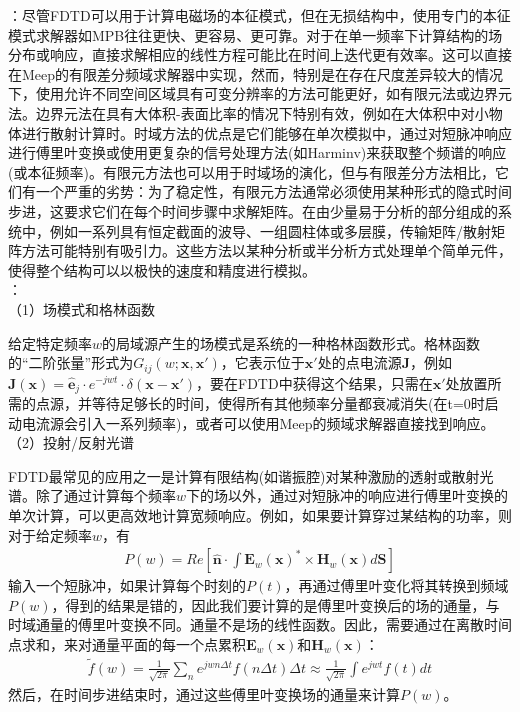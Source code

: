 \documentclass{article}
\numberwithin{equation}{section}
\renewcommand{\vec}[1]{\boldsymbol{#1}}
\begin{document}
\textbf{\color{blue}{Meep的优缺点}}：尽管FDTD可以用于计算电磁场的本征模式，但在无损结构中，使用专门的本征模式求解器如MPB往往更快、更容易、更可靠。对于在单一频率下计算结构的场分布或响应，直接求解相应的线性方程可能比在时间上迭代更有效率。这可以直接在Meep的有限差分频域求解器中实现，然而，特别是在存在尺度差异较大的情况下，使用允许不同空间区域具有可变分辨率的方法可能更好，如有限元法或边界元法。边界元法在具有大体积-表面比率的情况下特别有效，例如在大体积中对小物体进行散射计算时。时域方法的优点是它们能够在单次模拟中，通过对短脉冲响应进行傅里叶变换或使用更复杂的信号处理方法(如Harminv)来获取整个频谱的响应(或本征频率)。有限元方法也可以用于时域场的演化，但与有限差分方法相比，它们有一个严重的劣势：为了稳定性，有限元方法通常必须使用某种形式的隐式时间步进，这要求它们在每个时间步骤中求解矩阵。在由少量易于分析的部分组成的系统中，例如一系列具有恒定截面的波导、一组圆柱体或多层膜，传输矩阵/散射矩阵方法可能特别有吸引力。这些方法以某种分析或半分析方式处理单个简单元件，使得整个结构可以以极快的速度和精度进行模拟。\\
\textbf{\color{blue}{Meep的应用}}：\\
（1）场模式和格林函数\par
给定特定频率$w$的局域源产生的场模式是系统的一种格林函数形式。格林函数的“二阶张量”形式为$G_{ij}(w;\vec{x},\vec{x}')$，它表示位于$\vec{x}'$处的点电流源$\mathbf{J}$，例如$\mathbf{J}(\vec{x})=\hat{\vec{e}}_j\cdot e^{-jwt}\cdot\delta(\vec{x}-\vec{x}')$，要在FDTD中获得这个结果，只需在$\vec{x}'$处放置所需的点源，并等待足够长的时间，使得所有其他频率分量都衰减消失(在t=0时启动电流源会引入一系列频率)，或者可以使用Meep的频域求解器直接找到响应。\\
（2）投射/反射光谱\par
FDTD最常见的应用之一是计算有限结构(如谐振腔)对某种激励的透射或散射光谱。除了通过计算每个频率$w$下的场以外，通过对短脉冲的响应进行傅里叶变换的单次计算，可以更高效地计算宽频响应。例如，如果要计算穿过某结构的功率，则对于给定频率$w$，有
\begin{align}
    P(w)=Re\left[\hat{\vec{n}}\cdot\int\mathbf{E}_w(\vec{x})^*\times\mathbf{H}_w(\vec{x})d\vec{S}\right]
\end{align}
输入一个短脉冲，如果计算每个时刻的$P(t)$，再通过傅里叶变化将其转换到频域$P(w)$，得到的结果是错的，因此我们要计算的是傅里叶变换后的场的通量，与时域通量的傅里叶变换不同。通量不是场的线性函数。因此，需要通过在离散时间点求和，来对通量平面的每一个点累积$\mathbf{E}_w(\vec{x})$和$\mathbf{H}_w(\vec{x})$：
\begin{align}
    \tilde{f}(w)=\frac{1}{\sqrt{2\pi}}\sum_ne^{jwn\Delta t}f(n\Delta t)\Delta t\approx \frac{1}{\sqrt{2\pi}}\int e^{jwt}f(t)dt
\end{align}
然后，在时间步进结束时，通过这些傅里叶变换场的通量来计算$P(w)$。
\end{document}
